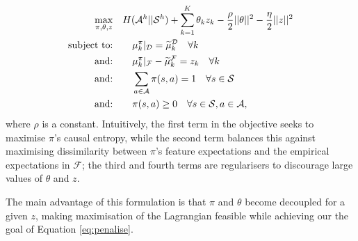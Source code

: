 \documentclass{aamas2016}
\newcommand{\sw}[1]{\textcolor{red}{SW: #1}}
\newcommand{\jm}[1]{\textcolor{blue}{Joao: #1}}
\newcommand{\sw}[1]{}
\newcommand{\jm}[1]{}
\begin{document}
\begin{align}
 \quad\max\limits_{\pi,\theta,z}&\quad H(\mathcal{A}^h||\mathcal{S}^h) + \sum_{k=1}^K \theta_k z_k - \frac{\rho}{2}||\mathbf{\theta}||^2 - \frac{\eta}{2}||z||^2 \label{eq:primal_obj_failure}\\
\hbox{subject to:}&\quad \quad\mu^{\pi}_k|_{\mathcal{D}}=\widetilde{\mu}^{\mathcal{D}}_k\quad\forall k \label{eq:features_equality_constraint_failure}\\
\hbox{and:}&\quad \quad  \mu_k^{\pi}|_{\mathcal{F}} -\widetilde{\mu}_k^{\mathcal{F}}=z_k \quad \forall k\\
\hbox{and:}&\quad \quad\sum_{a\in\mathcal{A}}\pi(s,a)  = 1\quad\forall s\in\mathcal{S}\\
\hbox{and:}&\quad \quad\pi(s,a) \geq 0\quad\forall s\in\mathcal{S},a\in\mathcal{A},  
\end{align}
where $\rho$ is a constant.  
Intuitively, the first term in the objective seeks to maximise $\pi$'s causal entropy, while the second term balances this against maximising dissimilarity between $\pi$'s feature expectations and the empirical expectations in $\mathcal{F}$; the third and fourth terms are regularisers to discourage large values of $\theta$ and $z$.

The main advantage of this formulation is that $\pi$ and $\theta$ become decoupled for a given $z$, making maximisation of the Lagrangian feasible while achieving our the goal of Equation \eqref{eq:penalise}. 
\end{document}
